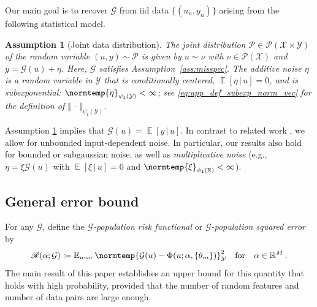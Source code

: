 \documentclass{article}
\theoremstyle{plain}
\newtheorem{assumption}[theorem]{Assumption}
\theoremstyle{my_def}
\theoremstyle{my_rem}
\numberwithin{equation}{section}
\numberwithin{theorem}{section}%
\newcommand{\R}{\mathbb{R}}
\newcommand{\E}{\mathbb{E}}
\newcommand{\scrR}{\mathscr{R}}
\newcommand{\scrP}{\mathscr{P}}
\newcommand{\cG}{\mathcal{G}}
\newcommand{\cP}{\mathcal{P}}
\newcommand{\cX}{\mathcal{X}}
\newcommand{\cY}{\mathcal{Y}}
\newcommand{\norm}{\normtemp}
\newcommand{\slot}{{\,\cdot\,}}
\newcommand{\defeq}{\coloneqq} %
\newcommand{\condbar}{\, \vert \,}
\renewcommand{\E}{\operatorname{\mathbb{E}}} %
\newcommand{\al}{\alpha}
\def\qf{\quad\text{for}\quad}
\newcommand{\Th}{{\{\theta_m\}}}
\begin{document}
Our main goal is to recover $\cG$ from iid data $\{(u_n,y_n)\}$ arising from the following statistical model.
\begin{assumption}[Joint data distribution]\label{ass:joint_dist_noise}
    The joint distribution $\cP\in\scrP(\cX\times \cY)$ of the random variable $(u,y)\sim\cP$ is given by $u\sim \nu$ with $\nu\in\scrP(\cX)$ and $y=\cG(u) + \eta$. Here, $\cG$ satisfies Assumption~\ref{ass:misspec}.
    The additive noise $\eta$ is a random variable in $\cY$ that is conditionally centered, $\E[\eta\condbar u]=0$, and is subexponential: $\norm{\eta}_{\psi_1(\cY)}<\infty$; see \eqref{eq:app_def_subexp_norm_vec} for the definition of $\Vert \slot \Vert_{\psi_1(\cY)}$.
\end{assumption}
Assumption \ref{ass:joint_dist_noise} implies that $\cG(u) = \E[y\condbar u]$. In contrast to related work \cite{bach2017equivalence,li2021towards,RR2008}, we allow for unbounded input-dependent noise. In particular, our results also hold for bounded or subgaussian noise, as well as \emph{multiplicative noise} (e.g., $\eta=\xi\cG(u)$ with $\E[\xi\condbar u]=0$ and $\norm{\xi}_{\psi_1(\R)}<\infty$).

\subsection{General error bound}\label{sec:main_error_bound}
For any $\cG$, define the \emph{$\cG$-population risk functional} or \emph{$\cG$-population squared error} by
\begin{equation}\label{eq:risk_pop_truth}
    \scrR(\al;\cG)\defeq \E_{u\sim\nu}\norm{\cG(u)-\Phi(u;\al,\Th)}_{\cY}^2 \qf \al\in\R^M\,.
\end{equation}
The main result of this paper establishes an upper bound for this quantity that holds with high probability, provided that the number of random features and number of data pairs are large enough.
\end{document}
